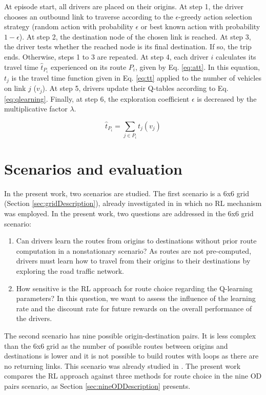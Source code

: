 \documentclass{RITA}
\newcommand{\route}[1]{\ensuremath{P_#1}}	%
\newcommand{\travTime}{\ensuremath{t_j}} 	%
\newcommand{\veh}{\ensuremath{v}}		%
\newcommand{\att}[1]{\ensuremath{\hat{t}_{#1}}}		%
\begin{document}
At episode start, all drivers are placed on their origins. At step 1, the driver chooses an outbound link to traverse according to the $\epsilon$-greedy action selection strategy (random action with probability $\epsilon$ or best known action with probability $1 - \epsilon$). At step 2, the destination node of the chosen link is reached. At step 3, the driver tests whether the reached node is its final destination. If so, the trip ends. Otherwise, steps 1 to 3 are repeated. At step 4, each driver $i$ calculates its travel time $\att{\route{i}}$ experienced on its route $\route{i}$, given by Eq. \eqref{eq:att}. In this equation, $\travTime$ is the travel time function given in Eq. \eqref{eq:tt} applied to the number of vehicles on link $j$ ($\veh_j$). At step 5, drivers update their Q-tables according to Eq. \eqref{eq:qlearning}. Finally, at step 6, the exploration coefficient $\epsilon$ is decreased by the multiplicative factor $\lambda$.

\begin{equation}
\label{eq:att}
\att{\route{i}} = \sum_{j \in \route{i}} \travTime(\veh_j)
\end{equation}



\section{Scenarios and evaluation}
\label{sec:scenario}
In the present work, two scenarios are studied. The first scenario is a 6x6 grid (Section \ref{sec:gridDescription}), already investigated in \cite{Bazzan+2007alag,Bazzan+2008alamas,Tavares&Bazzan2012bwss} in which no RL mechanism was employed. In the present work, two questions are addressed in the 6x6 grid scenario:

\begin{enumerate}
  \item Can drivers learn the routes from origins to destinations without prior route computation in a nonstationary scenario? As routes are not pre-computed, drivers must learn how to travel from their origins to their destinations by exploring the road traffic network.
  \item How sensitive is the RL approach for route choice regarding the Q-learning parameters? In this question, we want to assess the influence of the learning rate and the discount rate for future rewards on the overall performance of the drivers.
\end{enumerate}

The second scenario has nine possible origin-destination pairs. It is less complex than the 6x6 grid as the number of possible routes between origins and destinations is lower and it is not possible to build routes with loops as there are no returning links. This scenario was already studied in \cite{Tavares&Bazzan2012,Galib&Moser2011}. The present work compares the RL approach against three methods for route choice in the nine OD pairs scenario, as Section \ref{sec:nineODDescription} presents.
\end{document}
